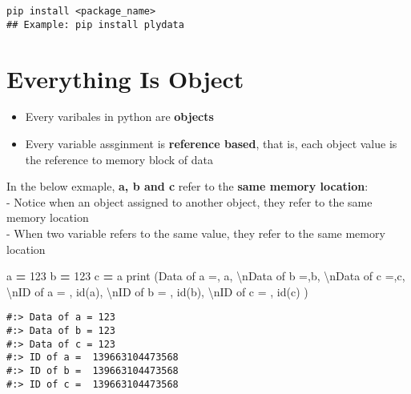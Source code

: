 \documentclass[
]{book}
\newenvironment{Shaded}{\begin{snugshade}}{\end{snugshade}}
\newcommand{\BuiltInTok}[1]{#1}
\newcommand{\CharTok}[1]{\textcolor[rgb]{0.5,0.5,0.5}{#1}}
\newcommand{\DecValTok}[1]{\textcolor[rgb]{0.06,0.06,0.06}{#1}}
\newcommand{\NormalTok}[1]{#1}
\newcommand{\OperatorTok}[1]{\textcolor[rgb]{0.43,0.43,0.43}{\textbf{#1}}}
\newcommand{\StringTok}[1]{\textcolor[rgb]{0.5,0.5,0.5}{#1}}
\providecommand{\tightlist}{%
  \setlength{\itemsep}{0pt}\setlength{\parskip}{0pt}}
\begin{document}
\begin{verbatim}
pip install <package_name>
## Example: pip install plydata
\end{verbatim}

\hypertarget{everything-is-object}{%
\section{Everything Is Object}\label{everything-is-object}}

\begin{itemize}
\tightlist
\item
  Every varibales in python are \textbf{objects}\\
\item
  Every variable assginment is \textbf{reference based}, that is, each object value is the reference to memory block of data
\end{itemize}

In the below exmaple, \textbf{a, b and c } refer to the \textbf{same memory location}:\\
- Notice when an object assigned to another object, they refer to the same memory location\\
- When two variable refers to the same value, they refer to the same memory location

\begin{Shaded}
\begin{Highlighting}[]
\NormalTok{a }\OperatorTok{=} \DecValTok{123}
\NormalTok{b }\OperatorTok{=} \DecValTok{123}  
\NormalTok{c }\OperatorTok{=}\NormalTok{ a}
\BuiltInTok{print}\NormalTok{ (}\StringTok{\textquotesingle{}Data of a =\textquotesingle{}}\NormalTok{,  a,}
       \StringTok{\textquotesingle{}}\CharTok{\textbackslash{}n}\StringTok{Data of b =\textquotesingle{}}\NormalTok{,b,}
       \StringTok{\textquotesingle{}}\CharTok{\textbackslash{}n}\StringTok{Data of c =\textquotesingle{}}\NormalTok{,c,}
       \StringTok{\textquotesingle{}}\CharTok{\textbackslash{}n}\StringTok{ID of a = \textquotesingle{}}\NormalTok{, }\BuiltInTok{id}\NormalTok{(a),}
       \StringTok{\textquotesingle{}}\CharTok{\textbackslash{}n}\StringTok{ID of b = \textquotesingle{}}\NormalTok{, }\BuiltInTok{id}\NormalTok{(b),}
       \StringTok{\textquotesingle{}}\CharTok{\textbackslash{}n}\StringTok{ID of c = \textquotesingle{}}\NormalTok{, }\BuiltInTok{id}\NormalTok{(c)}
\NormalTok{)}
\end{Highlighting}
\end{Shaded}

\begin{verbatim}
#:> Data of a = 123 
#:> Data of b = 123 
#:> Data of c = 123 
#:> ID of a =  139663104473568 
#:> ID of b =  139663104473568 
#:> ID of c =  139663104473568
\end{verbatim}
\end{document}
